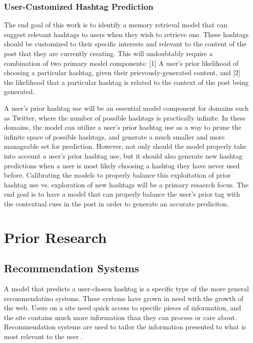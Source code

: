 \documentclass[man,floatsintext]{apa6}
\begin{document}
\subsubsection{User-Customized Hashtag Prediction}

The end goal of this work is to identify a memory retrieval model that can suggest relevant hashtags to users when they wish to retrieve one.
These hashtags should be customized to their specific interests and relevant to the content of the post that they are currently creating.
This will undoubtably require a combination of two primary model components:
[1] A user's prior likelihood of choosing a particular hashtag, given their prievously-generated content, and [2] the likelihood that a particular hashtag is related to the context of the post being generated. 

A user's prior hashtag use will be an essential model component for domains such as Twitter, where the number of possible hashtags is practically infinite.
In these domains, the model can utilize a user's prior hashtag use as a way to prune the infinite space of possible hashtags, and generate a much smaller and more manageable set for prediction.
However, not only should the model properly take into account a user's prior hashtag use, but it should also generate new hashtag predictions when a user is most likely choosing a hashtag they have never used before.
Calibrating the models to properly balance this exploitation of prior hashtag use vs. exploration of new hashtags will be a primary resaerch focus.
The end goal is to have a model that can properly balance the user's prior tag with the contextual cues in the post in order to generate an accurate prediciton.

\section{Prior Research}

\subsection{Recommendation Systems}

A model that predicts a user-chosen hashtag is a specific type of the more general recommendatino systems.
These systems have grown in need with the growth of the web.
Users on a site need quick access to specific pieces of information, and the site contains much more information than they can process or care about.
Recommendation systems are used to tailor the information presented to what is most relevant to the user \parencite{Pazzani2007}.
\end{document}
